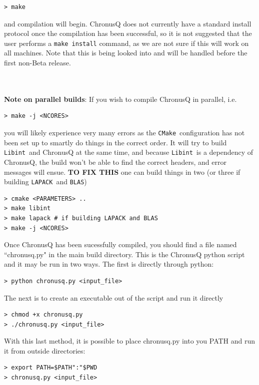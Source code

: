 \documentclass[12pt]{article}
\newcommand{\CMake}{\texttt{CMake}}
\newcommand{\Libint}{\texttt{Libint}}
\newcommand{\LAPACK}{\texttt{LAPACK}}
\newcommand{\BLAS}{\texttt{BLAS}}
\begin{document}
    \begin{lstlisting}
> make
    \end{lstlisting}

    \noindent and compilation will begin. ChronusQ does not currently have a 
    standard install protocol once the compilation has been successful, so it is
    not suggested that the user performs a \texttt{make install} command, as we are 
    not sure if this will work on all machines. Note that this is being looked into 
    and will be handled before the first non-Beta release.

    ~\\
    ~\\
    \noindent \textbf{Note on parallel builds}: If you wish to compile ChronusQ in 
    parallel, i.e.

    \begin{lstlisting}
> make -j <NCORES>
    \end{lstlisting}

    \noindent you will likely experience very many errors as the 
    \CMake~configuration has not been set up to smartly do things in the correct 
    order. It will try to build \Libint~and ChronusQ at the same time, and because 
    \Libint~is a dependency of ChronusQ, the build won't be able to find the 
    correct headers, and error messages will ensue. \textbf{TO FIX THIS} one can 
    build things in two (or three if building \LAPACK~and \BLAS)
    
    \begin{lstlisting}
> cmake <PARAMETERS> ..
> make libint
> make lapack # if building LAPACK and BLAS
> make -j <NCORES>
    \end{lstlisting}
    
    \noindent Once ChronusQ has been sucessfully compiled, you should find a file
    named ``chronusq.py" in the main build directory. This is the ChronusQ python
    script and it may be run in two ways. The first is directly through python:

    \begin{lstlisting}
> python chronusq.py <input_file>
    \end{lstlisting}

    \noindent The next is to create an executable out of the script and run it
    directly

    \begin{lstlisting}
> chmod +x chronusq.py
> ./chronusq.py <input_file>
    \end{lstlisting}

    \noindent With this last method, it is possible to place chronusq.py into you
    PATH and run it from outside directories:

    \begin{lstlisting}
> export PATH=$PATH":"$PWD
> chronusq.py <input_file>
    \end{lstlisting}
\end{document}
